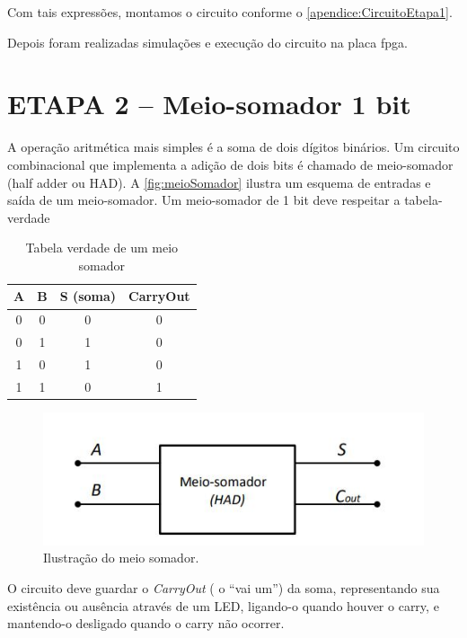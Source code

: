 		Com tais expressões, montamos o circuito conforme o \autoref{apendice:CircuitoEtapa1}.

		Depois foram realizadas simulações e execução do circuito na placa \ac{fpga}.

	\section{ETAPA 2 – Meio-somador 1 bit}

		A operação aritmética mais simples é a soma de dois dígitos binários. Um circuito combinacional
		que implementa a adição de dois bits é chamado de meio-somador (half adder ou HAD).
		A \autoref{fig:meioSomador} ilustra um esquema de entradas e saída de um meio-somador.
		Um meio-somador de 1 bit deve respeitar a tabela-verdade

		\begin{table}[h]
			\centering
			\caption{Tabela verdade de um meio somador}
			\label{table:tabelaMeioSomador}
			\begin{tabular}{c|c|c|c}
				\textbf{A} & \textbf{B} & \textbf{S (soma)} & \textbf{CarryOut} \\
				\hline
				0 & 0 & 0 & 0\\
				0 & 1 & 1 & 0\\
				1 & 0 & 1 & 0\\
				1 & 1 & 0 & 1\\
			\end{tabular}
		\end{table}

		\begin{figure}[H]
			\centering
			\caption{\label{fig:meioSomador}Ilustração do meio somador.}
			\includegraphics[width=1\textwidth]{img/meioSomador}
		\end{figure}

		O circuito deve guardar o \textit{CarryOut} ( o “vai um”) da soma, representando sua existência
		ou ausência através de um LED, ligando-o quando houver o carry, e mantendo-o desligado quando
		o carry não ocorrer.

